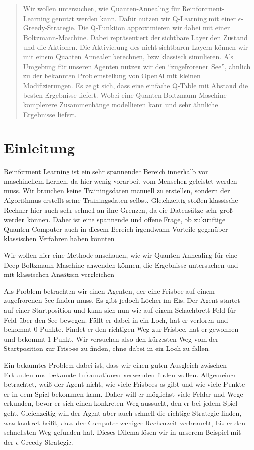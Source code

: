 \begin{abstract}
Wir wollen untersuchen, wie Quanten-Annealing für Reinforcment-Learning genutzt werden kann. Dafür nutzen wir Q-Learning mit einer $\epsilon$-Greedy-Strategie. Die Q-Funktion approximieren wir dabei mit einer Boltzmann-Maschine. Dabei repräsentiert der sichtbare Layer den Zustand und die Aktionen. Die Aktivierung des nicht-sichtbaren Layern können wir mit einem Quanten Annealer berechnen, bzw klassisch simulieren. Als Umgebung für unseren Agenten nutzen wir den ``zugefrorenen See'', ähnlich zu der bekannten Problemstellung von OpenAi mit kleinen Modifizierungen. Es zeigt sich, dass eine einfache Q-Table mit Abstand die besten Ergebnisse liefert. Wobei eine Quanten-Boltzmann Maschine komplexere Zusammenhänge modellieren kann und sehr ähnliche Ergebnisse liefert.
\end{abstract}

\section{Einleitung }
\label{sec:int}

Reinforment Learning ist ein sehr spannender Bereich innerhalb von maschinellem Lernen, da hier wenig vorarbeit vom Menschen geleistet werden muss. Wir brauchen keine Trainingsdaten manuell zu erstellen, sondern der Algorithmus erstellt seine Trainingsdaten selbst. Gleichzeitig stoßen klassische Rechner hier auch sehr schnell an ihre Grenzen, da die Datensätze sehr groß werden können. Daher ist eine spannende und offene Frage, ob zukünftige Quanten-Computer auch in diesem Bereich irgendwann Vorteile gegenüber klassischen Verfahren haben könnten.

Wir wollen hier eine Methode anschauen, wie wir Quanten-Annealing für eine Deep-Boltzmann-Maschine anwenden können, die Ergebnisse untersuchen und mit klassischen Ansätzen vergleichen.

Als Problem betrachten wir einen Agenten, der eine Frisbee auf einem zugefrorenen See finden muss. Es gibt jedoch Löcher im Eis. Der Agent startet auf einer Startposition und kann sich nun wie auf einem Schachbrett Feld für Feld über den See bewegen. Fällt er dabei in ein Loch, hat er verloren und bekommt 0 Punkte. Findet er den richtigen Weg zur Frisbee, hat er gewonnen und bekommt 1 Punkt. Wir versuchen also den kürzesten Weg vom der Startposition zur Frisbee zu finden, ohne dabei in ein Loch zu fallen.

Ein bekanntes Problem dabei ist, dass wir einen guten Ausgleich zwischen Erkunden und bekannte Informationen verwenden finden wollen. Allgemeiner betrachtet, weiß der Agent nicht, wie viele Frisbees es gibt und wie viele Punkte er in dem Spiel bekommen kann. Daher will er möglichst viele Felder und Wege erkunden, bevor er sich einen konkreten Weg aussucht, den er bei jedem Spiel geht. Gleichzeitig will der Agent aber auch schnell die richtige Strategie finden, was konkret heißt, dass der Computer weniger Rechenzeit verbraucht, bis er den schnellsten Weg gefunden hat. Dieses Dilema lösen wir in unserem Beispiel mit der $\epsilon$-Greedy-Strategie.

